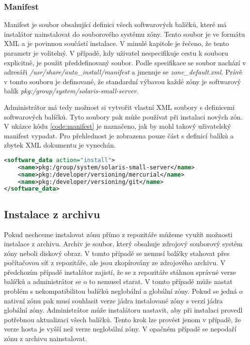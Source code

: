 \subsubsection{Manifest}
\label{chapter:zones:instalation:repozitory:manifest}
Manifest je soubor obsahující definici všech softwarových balíčků, které má instalátor nainstalovat do souborového systému zóny.
Tento soubor je ve formátu XML a je povinnou součástí instalace. V minulé kapitole je řečeno, že tento parametr je volitelný.
V případě, kdy uživatel nespecifikuje cestu k souboru explicitně, je použit předdefinovaný soubor. Podle specifikace
\cite{oracle:solaris:zones:manifest} se soubor nachází v adresáři \textit{/usr/share/auto\_install/manifest} a jmenuje
se \textit{zone\_default.xml}. Právě v tomto souboru je definované, že standardní výbavou každé zóny je softwarový balík 
\textit{pkg:/group/system/solaris-small-server}.

Administrátor má tedy možnost si vytvořit vlastní XML soubory s definicemi softwarových balíčků. Tyto soubory pak může používat
při instalaci nových zón. V ukázce kódu \ref{code:manifest} je naznačeno, jak by mohl takový uživatelský manifest vypadat.
Pro přehlednost je zobrazena pouze část s definicí balíků a zbytek XML dokumentu je vynechán.
\begin{lstlisting}[language={XML}, caption={Ukázkový manifest}, label={code:manifest}]
<software_data action="install">    
    <name>pkg:/group/system/solaris-small-server</name>
    <name>pkg:/developer/versioning/mercurial</name>
    <name>pkg:/developer/versioning/git</name>    
</software_data>
\end{lstlisting}
\subsection{Instalace z archivu}
\label{chapter:zones:instalation:archive}
Pokud nechceme instalovat zónu přímo z repozitáře můžeme využít možnosti instalace z archivu. Archiv je soubor, který obsahuje
zdrojový souborový systém zóny neboli diskový obraz. V tomto případě se nemusí balíčky stahovat přes počítačovou síť z repozitáře,
ale jsou zkopírovány ze zdrojového archivu. V předchozím případě instalátor zajistí, že se z repozitáře stáhnou správné verze
balíčků a administrátor se o to nemusel starat. V tomto případě může nastat problém s nekompatibilitou balíčků neglobální a 
globální zóny. Pokud se jedná o nativní zónu pak musí souhlasit verze jádra instalované zóny s verzí jádra globální zóny. 
Administrátor může instalátoru nastavit, aby při instalaci provedl potřebnou aktualizaci všech balíčků. Tento krok lze provést
jenom v případě, že verze hosta je vyšší než verze neglobální zóny. V opačném případě se nepodaří zónu z archivu nainstalovat.

